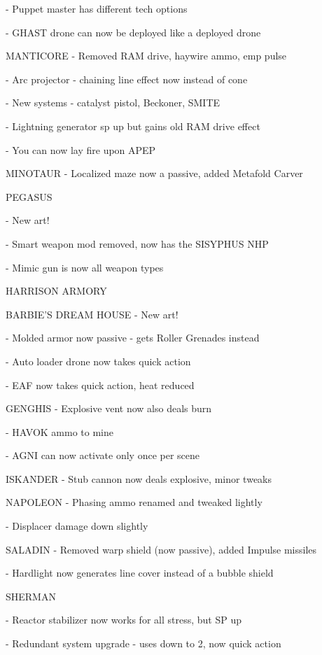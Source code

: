     -    Puppet master has different tech options

    -    GHAST drone can now be deployed like a deployed drone


MANTICORE
    -    Removed RAM drive, haywire ammo, emp pulse


    -    Arc projector - chaining line effect now instead of cone

    -    New systems - catalyst pistol, Beckoner, SMITE

    -    Lightning generator sp up but gains old RAM drive effect


    -    You can now lay fire upon APEP

MINOTAUR
    -    Localized maze now a passive, added Metafold Carver


PEGASUS

    -    New art!

    -    Smart weapon mod removed, now has the SISYPHUS NHP


    -    Mimic gun is now all weapon types


                                              HARRISON ARMORY

BARBIE’S DREAM HOUSE
    -    New art!


    -    Molded armor now passive - gets Roller Grenades instead

    -    Auto loader drone now takes quick action

    -    EAF now takes quick action, heat reduced


GENGHIS
    -    Explosive vent now also deals burn

    -    HAVOK ammo to mine


    -    AGNI can now activate only once per scene


ISKANDER
    -    Stub cannon now deals explosive, minor tweaks


NAPOLEON
    -    Phasing ammo renamed and tweaked lightly

    -    Displacer damage down slightly


SALADIN
    -    Removed warp shield (now passive), added Impulse missiles


    -    Hardlight now generates line cover instead of a bubble shield

SHERMAN

    -    Reactor stabilizer now works for all stress, but SP up


    -    Redundant system  upgrade - uses down to 2, now quick action

